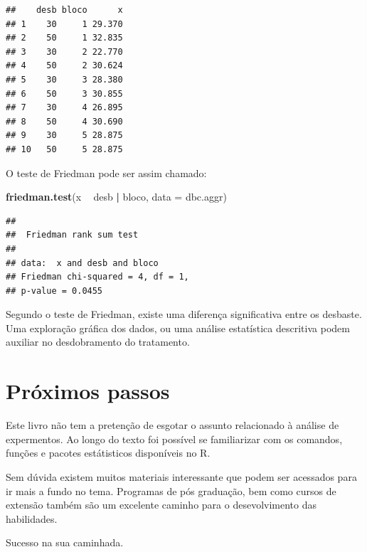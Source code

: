 \documentclass[
]{article}
\newenvironment{Shaded}{\begin{snugshade}}{\end{snugshade}}
\newcommand{\DataTypeTok}[1]{\textcolor[rgb]{0.13,0.29,0.53}{#1}}
\newcommand{\KeywordTok}[1]{\textcolor[rgb]{0.13,0.29,0.53}{\textbf{#1}}}
\newcommand{\NormalTok}[1]{#1}
\newcommand{\OperatorTok}[1]{\textcolor[rgb]{0.81,0.36,0.00}{\textbf{#1}}}
\newcommand{\StringTok}[1]{\textcolor[rgb]{0.31,0.60,0.02}{#1}}
\begin{document}
\begin{verbatim}
##    desb bloco      x
## 1    30     1 29.370
## 2    50     1 32.835
## 3    30     2 22.770
## 4    50     2 30.624
## 5    30     3 28.380
## 6    50     3 30.855
## 7    30     4 26.895
## 8    50     4 30.690
## 9    30     5 28.875
## 10   50     5 28.875
\end{verbatim}

O teste de Friedman pode ser assim chamado:

\begin{Shaded}
\begin{Highlighting}[]
\KeywordTok{friedman.test}\NormalTok{(x }\OperatorTok{~}\StringTok{ }\NormalTok{desb }\OperatorTok{|}\StringTok{ }\NormalTok{bloco, }\DataTypeTok{data =}\NormalTok{ dbc.aggr)}
\end{Highlighting}
\end{Shaded}

\begin{verbatim}
## 
##  Friedman rank sum test
## 
## data:  x and desb and bloco
## Friedman chi-squared = 4, df = 1,
## p-value = 0.0455
\end{verbatim}

Segundo o teste de Friedman, existe uma diferença significativa entre os desbaste. Uma exploração gráfica dos dados, ou uma análise estatística descritiva podem auxiliar no desdobramento do tratamento.

\hypertarget{pruxf3ximos-passos}{%
\section{Próximos passos}\label{pruxf3ximos-passos}}

Este livro não tem a pretenção de esgotar o assunto relacionado à análise de expermentos. Ao longo do texto foi possível se familiarizar com os comandos, funções e pacotes estátisticos disponíveis no R.

Sem dúvida existem muitos materiais interessante que podem ser acessados para ir mais a fundo no tema. Programas de pós graduação, bem como cursos de extensão também são um excelente caminho para o desevolvimento das habilidades.

Sucesso na sua caminhada.
\end{document}
